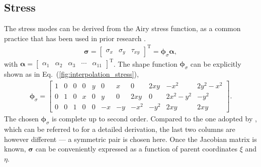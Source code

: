 \documentclass[3p,sort&compress,review,11pt]{elsarticle}
\newcommand*{\mT}{\mathrm{T}}
\newcommand*{\eqsref}[1]{Eq.~(\ref{#1})}
\begin{document}
\subsection{Stress}
The stress modes can be derived from the Airy stress function, as a common practice that has been used in prior research \citep[see, e.g.,][]{Fu2010,Cen2011,Nodargi2017}.
\begin{gather}
\mathbold{\sigma}=\begin{bmatrix}
	\sigma_x & \sigma_y & \tau_{xy}
\end{bmatrix}^\mT=\mathbold{\phi}_\sigma\mathbold{\alpha},
\end{gather}
with $\mathbold{\alpha}=\begin{bmatrix}
	\alpha_1 & \alpha_2 & \alpha_3 & \cdots & \alpha_{11}
\end{bmatrix}^\mT$. The shape function $\mathbold{\phi}_\sigma$ can be explicitly shown as in \eqsref{fig:interpolation_stress},
\begin{gather}\label{fig:interpolation_stress}
\mathbold{\phi}_\sigma=
\left[\begin{array}{ccc|cc|cc|cc|cc}
	1 & 0 & 0 & 0 & y & 0  & x  &  0   & 2xy  &   -x^2   & 2y^2-x^2 \\
	0 & 1 & 0 & x & 0 & y  & 0  & 2xy  &  0   & 2x^2-y^2 &   -y^2   \\
	0 & 0 & 1 & 0 & 0 & -x & -y & -x^2 & -y^2 &   2xy    &   2xy
\end{array}\right].
\end{gather}
The chosen $\mathbold{\phi}_\sigma$ is complete up to second order. Compared to the one adopted by \citet{Fu2010}, which can be referred to for a detailed derivation, the last two columns are however different --- a symmetric pair is chosen here. Once the Jacobian matrix is known, $\mathbold{\sigma}$ can be conveniently expressed as a function of parent coordinates $\xi$ and $\eta$.
\end{document}
